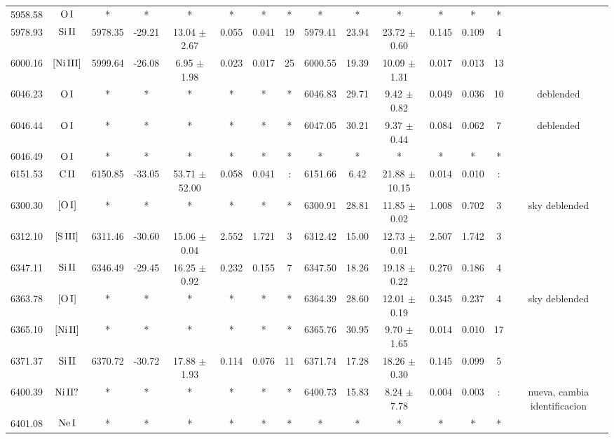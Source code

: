 \documentclass{article}
\begin{document}
\begin{table*}
\begin{adjustbox}{width=\textwidth}
\begin{tabular}{ccccccccccccccc}
5958.58 & $\mbox{O}\thinspace \mbox{I}$ & * & * & * & * & * & * & * & * & * & * & * & * &  \\
5978.93 & $\mbox{Si}\thinspace \mbox{II}$ & 5978.35 & -29.21 & 13.04 $\pm$ 2.67 & 0.055 & 0.041 & 19 & 5979.41 & 23.94 & 23.72 $\pm$ 0.60 & 0.145 & 0.109 & 4 &  \\
6000.16 & $\mbox{[Ni}\thinspace \mbox{III]}$ & 5999.64 & -26.08 & 6.95 $\pm$ 1.98 & 0.023 & 0.017 & 25 & 6000.55 & 19.39 & 10.09 $\pm$ 1.31 & 0.017 & 0.013 & 13 &  \\
6046.23 & $\mbox{O}\thinspace \mbox{I}$ & * & * & * & * & * & * & 6046.83 & 29.71 & 9.42 $\pm$ 0.82 & 0.049 & 0.036 & 10 &  deblended \\
6046.44 & $\mbox{O}\thinspace \mbox{I}$ & * & * & * & * & * & * & 6047.05 & 30.21 & 9.37 $\pm$ 0.44 & 0.084 & 0.062 & 7 &  deblended \\
6046.49 & $\mbox{O}\thinspace \mbox{I}$ & * & * & * & * & * & * & * & * & * & * & * & * &  \\
6151.53 & $\mbox{C}\thinspace \mbox{II}$ & 6150.85 & -33.05 & 53.71 $\pm$ 52.00 & 0.058 & 0.041 & : & 6151.66 & 6.42 & 21.88 $\pm$ 10.15 & 0.014 & 0.010 & : &  \\
6300.30 & $\mbox{[O}\thinspace \mbox{I]}$ & * & * & * & * & * & * & 6300.91 & 28.81 & 11.85 $\pm$ 0.02 & 1.008 & 0.702 & 3 &  sky deblended \\
6312.10 & $\mbox{[S}\thinspace \mbox{III]}$ & 6311.46 & -30.60 & 15.06 $\pm$ 0.04 & 2.552 & 1.721 & 3 & 6312.42 & 15.00 & 12.73 $\pm$ 0.01 & 2.507 & 1.742 & 3 &  \\
6347.11 & $\mbox{Si}\thinspace \mbox{II}$ & 6346.49 & -29.45 & 16.25 $\pm$ 0.92 & 0.232 & 0.155 & 7 & 6347.50 & 18.26 & 19.18 $\pm$ 0.22 & 0.270 & 0.186 & 4 &  \\
6363.78 & $\mbox{[O}\thinspace \mbox{I]}$ & * & * & * & * & * & * & 6364.39 & 28.60 & 12.01 $\pm$ 0.19 & 0.345 & 0.237 & 4 &  sky deblended \\
6365.10 & $\mbox{[Ni}\thinspace \mbox{II]}$ & * & * & * & * & * & * & 6365.76 & 30.95 & 9.70 $\pm$ 1.65 & 0.014 & 0.010 & 17 &  \\
6371.37 & $\mbox{Si}\thinspace \mbox{II}$ & 6370.72 & -30.72 & 17.88 $\pm$ 1.93 & 0.114 & 0.076 & 11 & 6371.74 & 17.28 & 18.26 $\pm$ 0.30 & 0.145 & 0.099 & 5 &  \\
6400.39 & $\mbox{Ni}\thinspace \mbox{II?}$ & * & * & * & * & * & * & 6400.73 & 15.83 & 8.24 $\pm$ 7.78 & 0.004 & 0.003 & : &  nueva, cambia identificacion \\
6401.08 & $\mbox{Ne}\thinspace \mbox{I}$ & * & * & * & * & * & * & * & * & * & * & * & * &  \\

\end{tabular}
\end{adjustbox}
\end{table*}
\end{document}
